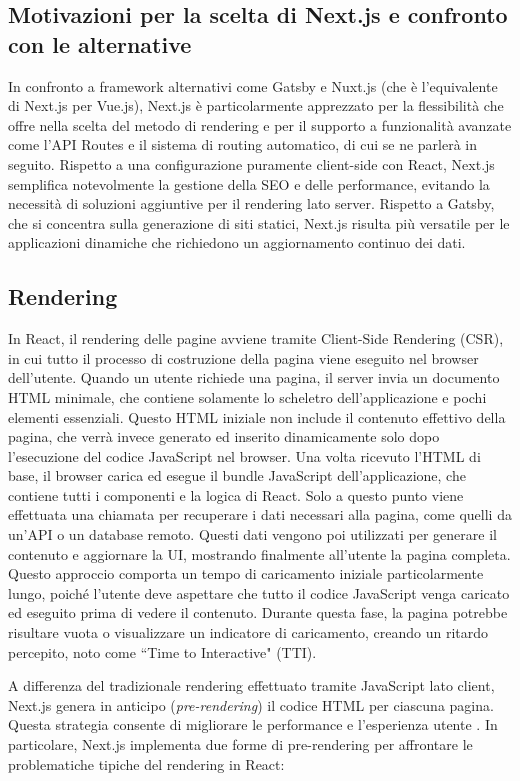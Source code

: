 \documentclass[target=bach,aauheader=,style=]{thud}
\begin{document}
\subsection{Motivazioni per la scelta di Next.js e confronto con le alternative}
In confronto a framework alternativi come Gatsby e Nuxt.js \cite{gatsbyvsnextvsnuxt} (che è l'equivalente di Next.js per Vue.js), Next.js è particolarmente apprezzato per la flessibilità che offre nella scelta del metodo di rendering e per il supporto a funzionalità avanzate come l'API Routes e il sistema di routing automatico, di cui se ne parlerà in seguito. Rispetto a una configurazione puramente client-side con React, Next.js semplifica notevolmente la gestione della SEO e delle performance, evitando la necessità di soluzioni aggiuntive per il rendering lato server. Rispetto a Gatsby, che si concentra sulla generazione di siti statici, Next.js risulta più versatile per le applicazioni dinamiche che richiedono un aggiornamento continuo dei dati.

\subsection{Rendering}
In React, il rendering delle pagine avviene tramite Client-Side Rendering (CSR), in cui tutto il processo di costruzione della pagina viene eseguito nel browser dell'utente. Quando un utente richiede una pagina, il server invia un documento HTML minimale, che contiene solamente lo scheletro dell'applicazione e pochi elementi essenziali. Questo HTML iniziale non include il contenuto effettivo della pagina, che verrà invece generato ed inserito dinamicamente solo dopo l'esecuzione del codice JavaScript nel browser. Una volta ricevuto l'HTML di base, il browser carica ed esegue il bundle JavaScript dell'applicazione, che contiene tutti i componenti e la logica di React. Solo a questo punto viene effettuata una chiamata per recuperare i dati necessari alla pagina, come quelli da un'API o un database remoto. Questi dati vengono poi utilizzati per generare il contenuto e aggiornare la UI, mostrando finalmente all'utente la pagina completa. Questo approccio comporta un tempo di caricamento iniziale particolarmente lungo, poiché l'utente deve aspettare che tutto il codice JavaScript venga caricato ed eseguito prima di vedere il contenuto. Durante questa fase, la pagina potrebbe risultare vuota o visualizzare un indicatore di caricamento, creando un ritardo percepito, noto come ``Time to Interactive" (TTI).

\noindent A differenza del tradizionale rendering effettuato tramite JavaScript lato client, Next.js genera in anticipo (\textit{pre-rendering}) il codice HTML per ciascuna pagina. Questa strategia consente di migliorare le performance e l'esperienza utente \cite{jartarghar2022react}. In particolare, Next.js implementa due forme di pre-rendering per affrontare le problematiche tipiche del rendering in React:
\end{document}
